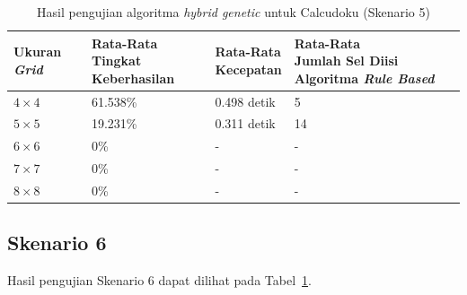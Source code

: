 \begin{table}
\centering
\captionsetup{justification=centering}
\caption[Hasil pengujian algoritma \textit{hybrid genetic} untuk Calcudoku (Skenario 5)]{Hasil pengujian algoritma \textit{hybrid genetic} untuk Calcudoku (Skenario 5)}
\begin{tabular}{| l | l | l | l |}
\hline
Ukuran \textit{Grid} & \makecell[l]{Rata-Rata \\ Tingkat Keberhasilan} & \makecell[l]{Rata-Rata \\ Kecepatan} & \makecell[l]{Rata-Rata \\ Jumlah Sel Diisi Algoritma \textit{Rule Based}} \\
\hline \hline
\begin{math}4 \times 4\end{math} & 61.538\% & 0.498 detik & 5 \\
\hline
\begin{math}5 \times 5\end{math} & 19.231\% & 0.311 detik & 14 \\
\hline
\begin{math}6 \times 6\end{math} & 0\% & - & - \\
\hline
\begin{math}7 \times 7\end{math} & 0\% & - & - \\
\hline
\begin{math}8 \times 8\end{math} & 0\% & - & - \\
\hline
\end{tabular}
\label{tab:pengujianhg5}
\end{table}

\subsection{Skenario 6}
\label{sec:skenario6}

Hasil pengujian Skenario 6 dapat dilihat pada Tabel~\ref{tab:pengujianhg5}.

